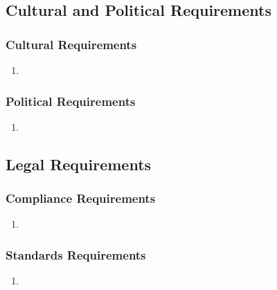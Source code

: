 \documentclass[]{article}
\begin{document}

\subsection{Cultural and Political Requirements}
\label{sub:cultural_and_political_requirements}

\subsubsection{Cultural Requirements}
\label{ssub:cultural_requirements}
\begin{enumerate}[{CP-C}1. ]
	\item 
\end{enumerate}

\subsubsection{Political Requirements}
\label{ssub:political_requirements}
\begin{enumerate}[{CP-P}1. ]
	\item 
\end{enumerate}


\subsection{Legal Requirements}
\label{sub:legal_requirements}

\subsubsection{Compliance Requirements}
\label{ssub:compliance_requirements}
\begin{enumerate}[{LR-COMP}1. ]
	\item 
\end{enumerate}

\subsubsection{Standards Requirements}
\label{ssub:standards_requirements}
\begin{enumerate}[{LR-STD}1. ]
	\item 
\end{enumerate}
\end{document}
